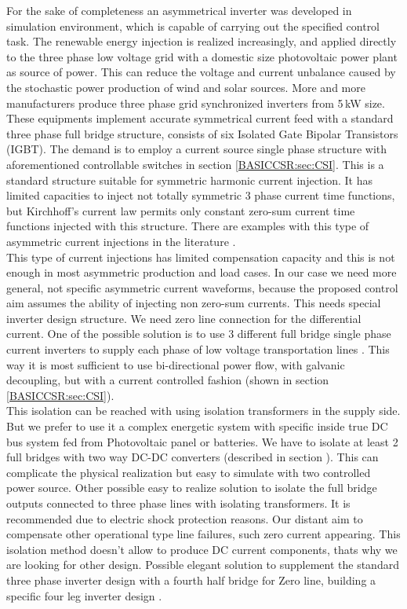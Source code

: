     For the sake of completeness an asymmetrical inverter was developed in simulation environment, which is capable of carrying out the specified control task. The renewable energy injection is realized increasingly, and applied directly to the three phase low voltage grid  with a domestic size photovoltaic power plant as source of power. This can reduce the voltage and current unbalance caused by the stochastic power production of wind and solar sources. More and more manufacturers produce three phase grid synchronized inverters from 5\,kW size. These equipments implement accurate symmetrical current feed with a standard three phase full bridge structure, consists of six Isolated Gate Bipolar Transistors (IGBT). The demand is to employ a current source single phase structure with aforementioned controllable switches in section \ref{BASICCSR:sec:CSI}. This is a standard structure suitable for symmetric harmonic current injection. It has limited capacities to inject not totally symmetric 3 phase current time functions, but Kirchhoff's current law permits only constant zero-sum current time functions injected with this structure. There are examples with this type of asymmetric current injections in the literature \cite{lee2009new}.\\
    This type of current injections has limited compensation capacity and this is not enough in most asymmetric production and load cases. In our case we need more general, not specific asymmetric current waveforms, because the proposed control aim assumes the ability of injecting non zero-sum currents. This needs special inverter design structure. We need zero line connection for the differential current. One of the possible solution is to use 3 different full bridge single phase current inverters to supply each phase of low voltage transportation lines \cite{Patnaik2013topologies}. This way it is most sufficient to use bi-directional power flow, with galvanic decoupling, but with a current controlled fashion (shown in section \ref{BASICCSR:sec:CSI}).\\
    This isolation can be reached  with using isolation transformers in the supply side. But we prefer to use it a complex energetic system with specific inside true DC bus system fed from Photovoltaic panel or batteries. We have to isolate at least 2 full bridges with two way DC-DC converters (described in section \label{BASICCSR:sec:DCDC}). This can complicate the physical realization but easy to simulate with two controlled power source. Other possible easy to realize solution to isolate the full bridge outputs  connected to three phase lines with isolating transformers. It is recommended due to electric shock protection reasons. Our distant aim to compensate other operational type line failures, such zero current appearing. This isolation method doesn't allow to produce DC current components, thats why we are looking for other design. Possible elegant solution to supplement the standard three phase inverter design with a fourth half bridge for Zero line, building a specific four leg inverter design \cite{Ninad2014control}.\\
